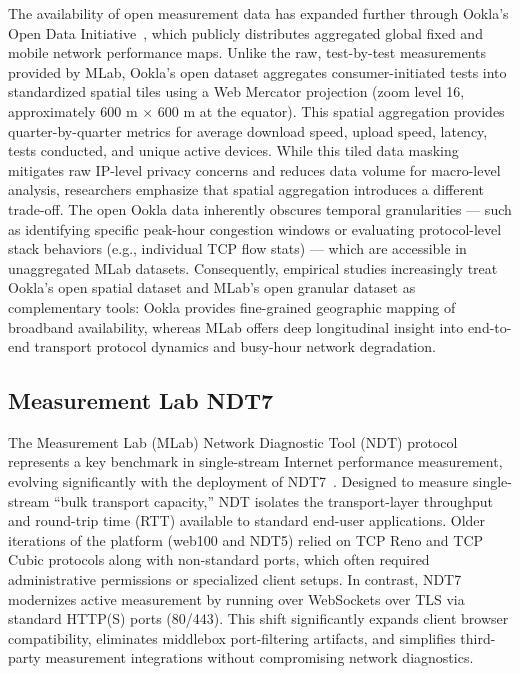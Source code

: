 \documentclass[sigconf,anonymous,review]{acmart}
\begin{document}
The availability of open measurement data has expanded further through
Ookla's Open Data Initiative~\cite{OoklaOpenData2023}, which publicly
distributes aggregated global fixed and mobile network performance maps.
Unlike the raw, test-by-test measurements provided by MLab, Ookla's open
dataset aggregates consumer-initiated tests into standardized spatial tiles
using a Web Mercator projection (zoom level 16, approximately 600 m
$\times$ 600 m at the equator). This spatial aggregation provides
quarter-by-quarter metrics for average download speed, upload speed,
latency, tests conducted, and unique active devices. While this tiled data
masking mitigates raw IP-level privacy concerns and reduces data volume for
macro-level analysis, researchers emphasize that spatial aggregation
introduces a different trade-off. The open Ookla data inherently obscures
temporal granularities --- such as identifying specific peak-hour
congestion windows or evaluating protocol-level stack behaviors (e.g.,
individual TCP flow stats) --- which are accessible in unaggregated MLab
datasets. Consequently, empirical studies increasingly treat Ookla's open
spatial dataset and MLab's open granular dataset as complementary tools:
Ookla provides fine-grained geographic mapping of broadband availability,
whereas MLab offers deep longitudinal insight into end-to-end transport
protocol dynamics and busy-hour network degradation.

\subsection{Measurement Lab NDT7}
The Measurement Lab (MLab) Network Diagnostic Tool (NDT) protocol
represents a key benchmark in single-stream Internet performance
measurement, evolving significantly with the deployment of
NDT7~\cite{Gill2022}. Designed to measure single-stream ``bulk transport
capacity,'' NDT isolates the transport-layer throughput and round-trip time
(RTT) available to standard end-user applications. Older iterations of the
platform (web100 and NDT5) relied on TCP Reno and TCP Cubic protocols along
with non-standard ports, which often required administrative permissions or
specialized client setups. In contrast, NDT7 modernizes active measurement
by running over WebSockets over TLS via standard HTTP(S) ports (80/443).
This shift significantly expands client browser compatibility, eliminates
middlebox port-filtering artifacts, and simplifies third-party measurement
integrations without compromising network diagnostics.
\end{document}
